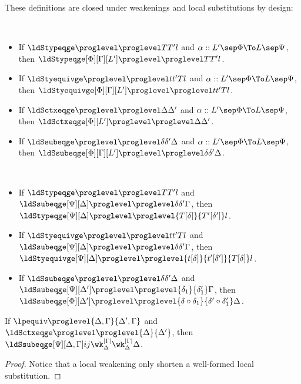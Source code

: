 These definitions are closed under weakenings and local substitutions by design:
\begin{lemma}[Weakenings] $ $
  \begin{itemize}
  \item If $\ldStypeqge \proglevel \proglevel T{T'} l$ and $\alpha :: L' \sep \Phi \To L \sep \Psi$,
    then $\ldStypeqge[\Phi][\Gamma][L'] \proglevel \proglevel T{T'} l$.
  \item If $\ldStyequivge \proglevel \proglevel t{t'} T l$ and $\alpha :: L' \sep \Phi \To L \sep \Psi$,
    then $\ldStyequivge[\Phi][\Gamma][L'] \proglevel \proglevel t{t'} T l$.
  \item If $\ldSctxeqge \proglevel \proglevel \Delta{\Delta'}$ and $\alpha :: L' \sep \Phi \To L \sep
    \Psi$, then $\ldSctxeqge[\Phi][L'] \proglevel \proglevel \Delta{\Delta'}$.
  \item If $\ldSsubeqge \proglevel \proglevel \delta{\delta'}\Delta$ and $\alpha :: L' \sep \Phi \To L
    \sep \Psi$, then $\ldSsubeqge[\Phi][\Gamma][L'] \proglevel \proglevel \delta{\delta'}\Delta$.
  \end{itemize}
\end{lemma}

\begin{lemma} $ $
  \begin{itemize}
  \item If $\ldStypeqge \proglevel \proglevel T{T'} l$ and $\ldSsubeqge[\Psi][\Delta] \proglevel \proglevel \delta{\delta'}\Gamma$,
    then $\ldStypeqge[\Psi][\Delta] \proglevel \proglevel {T[\delta]}{T'[\delta']} l$.
  \item If $\ldStyequivge \proglevel \proglevel t{t'} T l$ and $\ldSsubeqge[\Psi][\Delta] \proglevel \proglevel \delta{\delta'}\Gamma$,
    then $\ldStyequivge[\Psi][\Delta] \proglevel \proglevel {t[\delta]}{t'[\delta']}{T[\delta]} l$.
  \item If $\ldSsubeqge \proglevel \proglevel \delta{\delta'}\Delta$ and
    $\ldSsubeqge[\Psi][\Delta'] \proglevel \proglevel{\delta_1}{\delta_1'}\Gamma$, then
    $\ldSsubeqge[\Phi][\Delta'] \proglevel \proglevel{\delta \circ \delta_1}{\delta' \circ
      \delta_1'}\Delta$.
  \end{itemize}
\end{lemma}

\begin{lemma}
  If $\lpequiv \proglevel{\Delta,\Gamma}{\Delta',\Gamma}$ and $\ldSctxeqge \proglevel
  \proglevel{\Delta}{\Delta'}$, then \break
  $\ldSsubeqge[\Psi][\Delta,\Gamma] i j{\wk^{|\Gamma|}_{\Delta}}{\wk^{|\Gamma|}_{\Delta}}\Delta$.
\end{lemma}
\begin{proof}
  Notice that a local weakening only shorten a well-formed local substitution.
\end{proof}

